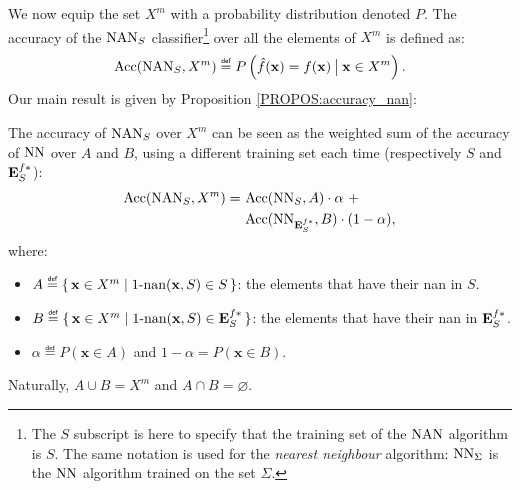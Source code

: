 We now equip the set $X^m$ with a probability distribution denoted $P$.  The
accuracy of the $\mbox{NAN}_S$ classifier\footnote{The $S$ subscript is here to
specify that the training set of the $\mbox{NAN}$ algorithm is $S$. The same notation
is used for the \textit{nearest neighbour} algorithm: $\text{NN}_\Sigma$ is the $\text{NN}$
algorithm trained on the set $\Sigma$.} over all the elements of $X^m$ is
defined as:
$$\acc(\NAN_S, X^m)\eqdef P\left(\hat{f}(\mathbf{x})=f(\mathbf{x}) \given[\big]
\mathbf{x} \in X^m\right).$$
Our main result is given by Proposition \ref{PROPOS:accuracy_nan}:
\begin{proposition}
  \label{PROPOS:accuracy_nan}
  The accuracy of $\mbox{NAN}_S$ over $X^m$ can be seen as the weighted sum of the
  accuracy of $\text{NN}$ over $A$ and $B$, using a different training set each time
  (respectively $S$ and $\mathbf{E}_{S}^{f*}$):
  \begin{align*}
    \mbox{Acc}(\mbox{NAN}_S, X^m) = ~&\mbox{Acc}(\text{NN}_S, A) \cdot \alpha ~ + \\
                        &\mbox{Acc}(\text{NN}_{\mathbf{E}_{S}^{f*}}, B) \cdot (1 - \alpha),
  \end{align*}
  where:
  \begin{itemize}
  \item $A \eqdef \set{\mathbf{x} \in X^m | \nan(\mathbf{x}, S) \in S}$: the
    elements that have their nan in $S$.
  \item $B \eqdef \set{\mathbf{x} \in X^m | \nan(\mathbf{x}, S) \in \esfs}$: the
    elements that have their nan in $\mathbf{E}_{S}^{f*}$.
  \item $\alpha \eqdef P(\mathbf{x} \in A)$ and $1 - \alpha = P(\mathbf{x} \in
    B)$. 
  \end{itemize}
  Naturally, $A \cup B = X^m$ and $A \cap B = \varnothing$.
\end{proposition}
